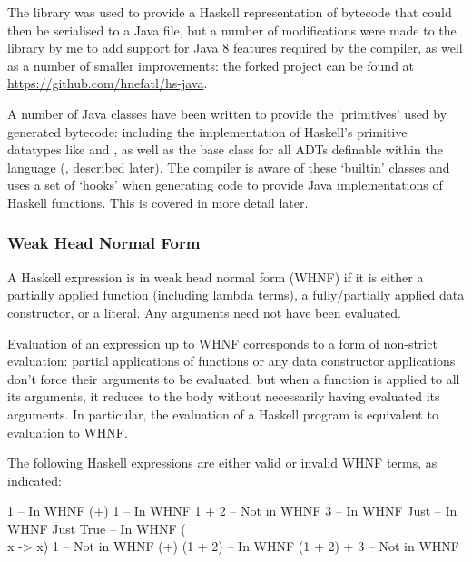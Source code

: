 \documentclass[dissertation.tex]{subfiles}
\begin{document}
{{        The  library was used to provide a Haskell representation of bytecode that could then be
        serialised to a Java  file, but a number of modifications were made to the library by me to
        add support for Java 8 features required by the compiler, as well as a number of smaller improvements: the
        forked project can be found at \url{https://github.com/hnefatl/hs-java}.

        A number of Java classes have been written to provide the `primitives' used by generated bytecode: including the
        implementation of Haskell's primitive datatypes like  and , as well as the base class
        for all ADTs definable within the language (, described later). The compiler is aware of
        these `builtin' classes and uses a set of `hooks' when generating code to provide Java implementations of
        Haskell functions. This is covered in more detail later.


        \subsubsection{Weak Head Normal Form}
        {

            A Haskell expression is in weak head normal form (WHNF) if it is either a partially applied function
            (including lambda terms), a fully/partially applied data constructor, or a literal. Any arguments need not
            have been evaluated.
            
            Evaluation of an expression up to WHNF corresponds to a form of non-strict evaluation: partial applications
            of functions or any data constructor applications don't force their arguments to be evaluated, but when a
            function is applied to all its arguments, it reduces to the body without necessarily having evaluated its
            arguments. In particular, the evaluation of a Haskell program is equivalent to evaluation to WHNF.

            The following Haskell expressions are either valid or invalid WHNF terms, as indicated:

            \begin{haskellfigure}
            1               -- In WHNF
            (+) 1           -- In WHNF
            1 + 2           -- Not in WHNF
            3               -- In WHNF
            Just            -- In WHNF
            Just True       -- In WHNF
            (\\x -> x) 1    -- Not in WHNF
            (+) (1 + 2)     -- In WHNF
            (1 + 2) + 3     -- Not in WHNF
            \end{haskellfigure}
        }
}}
\end{document}
